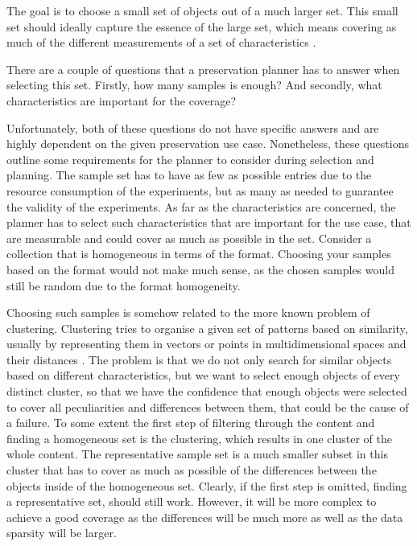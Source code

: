 The goal is to choose a small set of objects out of a much larger set.
This small set should ideally capture the essence of the large set, which means covering as much of the different measurements of a set of characteristics \cite{Becker:2011:PDT:1998076.1998089}.

There are a couple of questions that a preservation planner has to answer when selecting this set.
Firstly, how many samples is enough?
And secondly, what characteristics are important for the coverage?

Unfortunately, both of these questions do not have specific answers and are highly dependent on the given preservation use case.
Nonetheless, these questions outline some requirements for the planner to consider during selection and planning.
The sample set has to have as few as possible entries due to the resource consumption of the experiments, but as many as needed to guarantee the validity of the experiments.
As far as the characteristics are concerned, the planner has to select such characteristics that are important for the use case, that are measurable and could cover as much as possible in the set.
Consider a collection that is homogeneous in terms of the format.
Choosing your samples based on the format would not make much sense, as the chosen samples would still be random due to the format homogeneity.

Choosing such samples is somehow related to the more known problem of clustering.
Clustering tries to organise a given set of patterns based on similarity, usually by representing them in vectors or points in multidimensional spaces and their distances \cite{Jain:1999:DCR:331499.331504}.
The problem is that we do not only search for similar objects based on different characteristics, but we want to select enough objects of every distinct cluster, so that we have the confidence that enough objects were selected to cover all peculiarities and differences between them, that could be the cause of a failure.
To some extent the first step of filtering through the content and finding a homogeneous set is the clustering, which results   in one cluster of the whole content. The representative sample set is a much smaller subset in this cluster that has to cover as much as possible of the differences between the objects inside of the homogeneous set. Clearly, if the first step is omitted, finding a representative set, should still work. However, it will be more complex to achieve a good coverage as the differences will be much more as well as the data sparsity will be larger. 